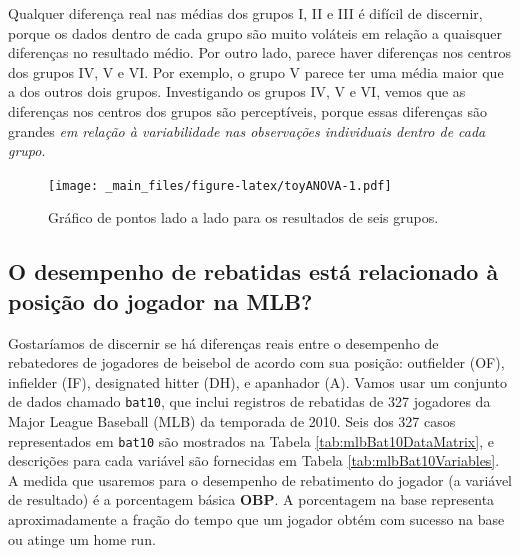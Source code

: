 \documentclass[
]{book}
\theoremstyle{definition}
\theoremstyle{definition}
\theoremstyle{definition}
\theoremstyle{definition}
\theoremstyle{remark}
\begin{document}
Qualquer diferença real nas médias dos grupos I, II e III é difícil de discernir, porque os dados dentro de cada grupo são muito voláteis em relação a quaisquer diferenças no resultado médio. Por outro lado, parece haver diferenças nos centros dos grupos IV, V e VI. Por exemplo, o grupo V parece ter uma média maior que a dos outros dois grupos. Investigando os grupos IV, V e VI, vemos que as diferenças nos centros dos grupos são perceptíveis, porque essas diferenças são grandes \emph{em relação à variabilidade nas observações individuais dentro de cada grupo}.

\begin{figure}
\centering
\texttt{[image: \_main\_files/figure-latex/toyANOVA-1.pdf]}
\caption{\label{fig:toyANOVA}Gráfico de pontos lado a lado para os resultados de seis grupos.}
\end{figure}

\hypertarget{hittingPerformancePositionMLB}{%
\subsection{O desempenho de rebatidas está relacionado à posição do jogador na MLB?}\label{hittingPerformancePositionMLB}}

Gostaríamos de discernir se há diferenças reais entre o desempenho de rebatedores de jogadores de beisebol de acordo com sua posição: outfielder (OF), infielder (IF), designated hitter (DH), e apanhador (A). Vamos usar um conjunto de dados chamado \texttt{bat10}, que inclui registros de rebatidas de 327 jogadores da Major League Baseball (MLB) da temporada de 2010. Seis dos 327 casos representados em \texttt{bat10} são mostrados na Tabela \ref{tab:mlbBat10DataMatrix}, e descrições para cada variável são fornecidas em Tabela \ref{tab:mlbBat10Variables}. A medida que usaremos para o desempenho de rebatimento do jogador (a variável de resultado) é a porcentagem básica \textbf{OBP}. A porcentagem na base representa aproximadamente a fração do tempo que um jogador obtém com sucesso na base ou atinge um home run.
\end{document}
